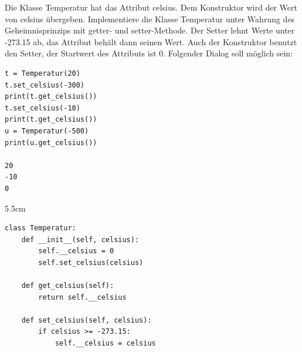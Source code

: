 \question[5]
Die Klasse Temperatur hat das Attribut celsius. Dem Konstruktor wird der Wert von celsius übergeben.
Implementiere die Klasse Temperatur unter Wahrung des Geheimnisprinzips mit getter- und setter-Methode.
Der Setter lehnt Werte unter -273.15 ab, das Attribut behält dann seinen Wert. Auch der Konstruktor benutzt
den Setter, der Startwert des Attributs ist 0. Folgender Dialog soll möglich sein:
\begin{lstlisting}
t = Temperatur(20)
t.set_celsius(-300)
print(t.get_celsius())
t.set_celsius(-10)
print(t.get_celsius())
u = Temperatur(-500)
print(u.get_celsius())

20
-10
0
\end{lstlisting}
\begin{solutionbox}{5.5cm}
\begin{lstlisting}
class Temperatur:
    def __init__(self, celsius):
        self.__celsius = 0
        self.set_celsius(celsius)

    def get_celsius(self):
        return self.__celsius

    def set_celsius(self, celsius):
        if celsius >= -273.15:
            self.__celsius = celsius
\end{lstlisting}
\end{solutionbox}
